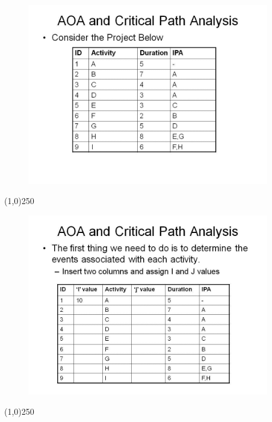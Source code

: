 \begin{frame}
\begin{figure}
	\centering
		\includegraphics[width = 10.5cm]{oldnotes/Slide61.jpg}
\end{figure}
\end{frame}
\begin{center}\line(1,0){250}\end{center}



\begin{frame}
\begin{figure}
	\centering
		\includegraphics[width = 10.5cm]{oldnotes/Slide62.jpg}
\end{figure}
\end{frame}
\begin{center}\line(1,0){250}\end{center}


